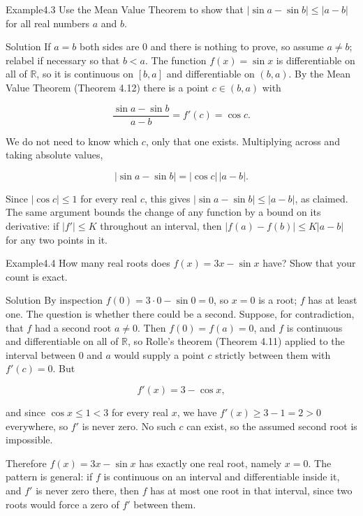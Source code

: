 \documentclass[a4paper,12pt,oneside]{memoir}
\begin{document}
\begin{workedexample}
\begin{envexample}{Example}{4.3}{}
Use the Mean Value Theorem to show that \(\lvert \sin a - \sin b \rvert \le \lvert a - b \rvert\) for all real numbers \(a\) and \(b\).
\end{envexample}
\begin{envsolution}{Solution}{}{}
If \(a = b\) both sides are \(0\) and there is nothing to prove, so assume \(a \ne b\); relabel if necessary so that \(b < a\). The function \(f(x) = \sin x\) is differentiable on all of \(\mathbb{R}\), so it is continuous on \([b, a]\) and differentiable on \((b, a)\). By the Mean Value Theorem (Theorem 4.12) there is a point \(c \in (b, a)\) with

\[ \frac{\sin a - \sin b}{a - b} = f'(c) = \cos c. \]

We do not need to know which \(c\), only that one exists. Multiplying across and taking absolute values,

\[ \lvert \sin a - \sin b \rvert = \lvert \cos c \rvert \,\lvert a - b \rvert. \]

Since \(\lvert \cos c \rvert \le 1\) for every real \(c\), this gives \(\lvert \sin a - \sin b \rvert \le \lvert a - b \rvert\), as claimed. The same argument bounds the change of any function by a bound on its derivative: if \(\lvert f' \rvert \le K\) throughout an interval, then \(\lvert f(a) - f(b) \rvert \le K \lvert a - b \rvert\) for any two points in it. \qedmark
\end{envsolution}
\end{workedexample}
\begin{workedexample}
\begin{envexample}{Example}{4.4}{}
How many real roots does \(f(x) = 3x - \sin x\) have? Show that your count is exact.
\end{envexample}
\begin{envsolution}{Solution}{}{}
By inspection \(f(0) = 3 \cdot 0 - \sin 0 = 0\), so \(x = 0\) is a root; \(f\) has at least one. The question is whether there could be a second. Suppose, for contradiction, that \(f\) had a second root \(a \ne 0\). Then \(f(0) = f(a) = 0\), and \(f\) is continuous and differentiable on all of \(\mathbb{R}\), so Rolle’s theorem (Theorem 4.11) applied to the interval between \(0\) and \(a\) would supply a point \(c\) strictly between them with \(f'(c) = 0\). But

\[ f'(x) = 3 - \cos x, \]

and since \(\cos x \le 1 < 3\) for every real \(x\), we have \(f'(x) \ge 3 - 1 = 2 > 0\) everywhere, so \(f'\) is never zero. No such \(c\) can exist, so the assumed second root is impossible.

Therefore \(f(x) = 3x - \sin x\) has exactly one real root, namely \(x = 0\). The pattern is general: if \(f\) is continuous on an interval and differentiable inside it, and \(f'\) is never zero there, then \(f\) has at most one root in that interval, since two roots would force a zero of \(f'\) between them. \qedmark
\end{envsolution}
\end{workedexample}
\end{document}
